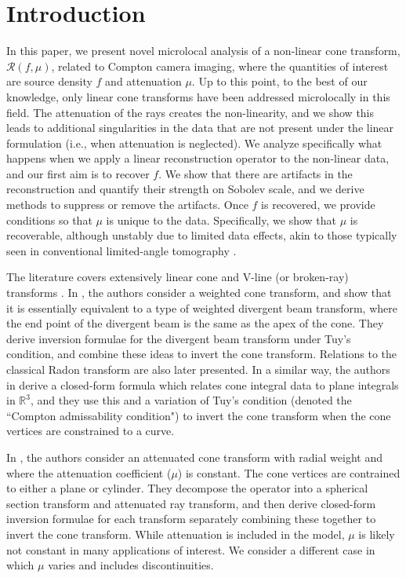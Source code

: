 \documentclass[a4paper,12pt]{amsart}
\numberwithin{equation}{section}
\theoremstyle{plain}
\numberwithin{theorem}{section}
\theoremstyle{definition}
\theoremstyle{remark}
\theoremstyle{remark}
\theoremstyle{remark}
\begin{document}
\section{Introduction}
In this paper, we present novel microlocal analysis of a non-linear cone transform, $\mathcal{R}(f,\mu)$, related to Compton camera imaging, where the quantities of interest are source density $f$ and attenuation $\mu$. Up to this point, to the best of our knowledge, only linear cone transforms have been addressed microlocally in this field. The attenuation of the rays creates the non-linearity, and we show this leads to additional singularities in the data that are not present under the linear formulation (i.e., when attenuation is neglected). We analyze specifically what happens when we apply a linear reconstruction operator to the non-linear data, and our first aim is to recover $f$. We show that there are artifacts in the reconstruction and quantify their strength on Sobolev scale, and we derive methods to suppress or remove the artifacts. Once $f$ is recovered, we provide conditions so that $\mu$ is unique to the data. Specifically, we show that $\mu$ is recoverable, although unstably due to limited data effects, akin to those typically seen in conventional limited-angle tomography \cite{frikel2013characterization,krishnan2014microlocal}.

The literature covers extensively linear cone and V-line (or broken-ray) transforms \cite{terzioglu2018compton, kuchment2016three, kuchment2017inversion, moon2025inversion, terzioglu2019some, AmbartsoumianLatifi-Vline2019, vline, morvidone2010v, ambartsoumian2012inversion, terzioglu2020exact, zhang2020recovery}. In \cite{kuchment2017inversion}, the authors consider a weighted cone transform, and show that it is essentially equivalent to a type of weighted divergent beam transform, where the end point of the divergent beam is the same as the apex of the cone. They derive inversion formulae for the divergent beam transform under Tuy's condition, and combine these ideas to invert the cone transform. Relations to the classical Radon transform are also later presented. In a similar way, the authors in \cite{terzioglu2020exact} derive a closed-form formula which relates cone integral data to plane integrals in $\mathbb{R}^3$, and they use this and a variation of Tuy's condition (denoted the ``Compton admissability condition") to invert the cone transform when the cone vertices are constrained to a curve.

In \cite{moon2025inversion}, the authors consider an attenuated cone transform with radial weight and where the attenuation coefficient ($\mu$) is constant. The cone vertices are contrained to either a plane or cylinder. They decompose the operator into a spherical section transform and attenuated ray transform, and then derive closed-form inversion formulae for each transform separately combining these together to invert the cone transform. While attenuation is included in the model, $\mu$ is likely not constant in many applications of interest. We consider a different case in which $\mu$ varies and includes discontinuities.
\end{document}

